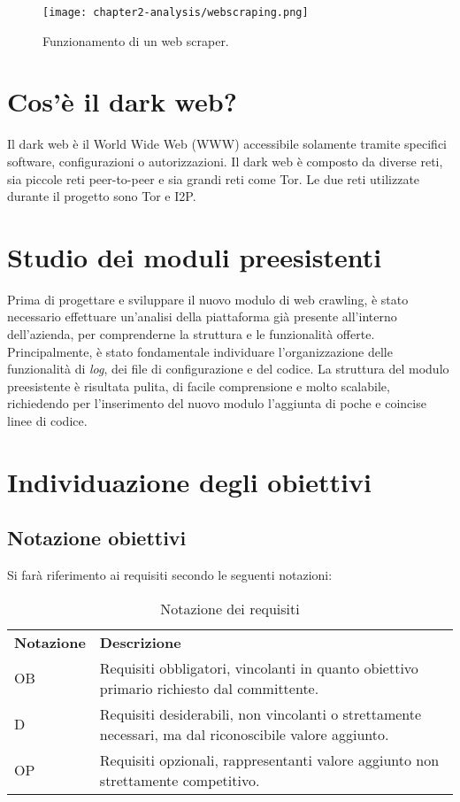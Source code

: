 \begin{figure}[!h] 
    \centering 
    \texttt{[image: chapter2-analysis/webscraping.png]} 
    \caption{Funzionamento di un web scraper.}
\end{figure}

\section{Cos'è il dark web?}
Il dark web è il World Wide Web (WWW) accessibile solamente tramite specifici software, configurazioni o autorizzazioni. Il dark web è composto da diverse reti, sia piccole reti peer-to-peer e sia grandi reti come \gls{Tor}. Le due reti utilizzate durante il progetto sono \gls{Tor} e \gls{I2P}.
\section{Studio dei moduli preesistenti}

Prima di progettare e sviluppare il nuovo modulo di web crawling, è stato necessario effettuare un’analisi della piattaforma già presente all'interno dell'azienda, per comprenderne la struttura e le funzionalità offerte. Principalmente, è stato fondamentale individuare l'organizzazione delle funzionalità di \emph{log}, dei file di configurazione e del codice. La struttura del modulo preesistente è risultata pulita, di facile comprensione e molto scalabile, richiedendo per l'inserimento del nuovo modulo l'aggiunta di poche e coincise linee di codice.

\section{Individuazione degli obiettivi}

\subsection{Notazione obiettivi}
Si farà riferimento ai requisiti secondo le seguenti notazioni:
\begin{longtable}{|p{}|p{}|}
	\caption{Notazione dei requisiti}
	\label{tab:notazione-requisiti} \\
	\hline
    \textbf{Notazione}	&	\textbf{Descrizione} \\
    OB			&	Requisiti obbligatori, vincolanti in quanto obiettivo primario richiesto dal committente. \\  
	\hline
    D			&	Requisiti desiderabili, non vincolanti o strettamente necessari, ma dal riconoscibile valore aggiunto. \\ 
	\hline
    OP			&	Requisiti opzionali, rappresentanti valore aggiunto non strettamente competitivo. \\
    \hline
\end{longtable}%


